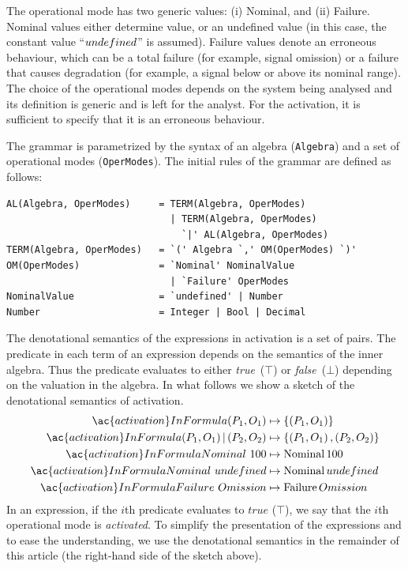 \documentclass[12pt,openright,twoside,a4paper,oldfontcommands,english,brazil,final]{abntex2}
\theoremstyle{theo}
\def\undefinednominal{\ensuremath undefined}
\newcommand{\Nominal}[1]{\ensuremath\mathop{\mathrm{Nominal}} #1}
\newcommand{\Failure}[1]{\ensuremath\mathop{\mathrm{Failure}} #1}
\begin{document}
The operational mode has two generic values: (i) Nominal, and (ii) Failure.
Nominal values either determine value, or an undefined value (in this case, the constant value ``$\undefinednominal$'' is assumed).
Failure values denote an erroneous behaviour, which can be a total failure (for example, signal omission) or a failure that causes degradation (for example, a signal below or above its nominal range).
The choice of the operational modes depends on the system being analysed and its definition is generic and is left for the analyst.
For the \ac{activation}, it is sufficient to specify that it is an erroneous behaviour.

The grammar is parametrized by the syntax of an algebra (\verb|Algebra|) and a set of operational modes (\verb|OperModes|).
The initial rules of the grammar are defined as follows:
\begin{verbatim}
AL(Algebra, OperModes)     = TERM(Algebra, OperModes) 
                             | TERM(Algebra, OperModes) 
                               `|' AL(Algebra, OperModes)
TERM(Algebra, OperModes)   = `(' Algebra `,' OM(OperModes) `)'
OM(OperModes)              = `Nominal' NominalValue 
                             | `Failure' OperModes
NominalValue               = `undefined' | Number
Number                     = Integer | Bool | Decimal
\end{verbatim}
%
The denotational semantics of the expressions in \ac{activation} is a set of pairs.
The predicate in each term of an expression depends on the semantics of the inner algebra.
Thus the predicate evaluates to either \emph{true}~($\top$) or \emph{false}~($\bot$) depending on the valuation in the algebra.
In what follows we show a sketch of the denotational semantics of \ac{activation}.
%
\begin{align*}
  \ac{activation}InFormula{\left(P_1, O_1\right)} &\mapsto \{\left(P_1, O_1\right)\}\\
  \ac{activation}InFormula{\left(P_1, O_1\right) | \left(P_2, O_2\right)} &\mapsto
    \{\left(P_1, O_1\right), \left(P_2, O_2\right)\}\\
  \ac{activation}InFormula{Nominal~100} &\mapsto \Nominal{100}\\
  \ac{activation}InFormula{Nominal~undefined} &\mapsto \Nominal{\undefinednominal}\\
  \ac{activation}InFormula{Failure~Omission} &\mapsto \Failure{Omission}
\end{align*}
%
In an expression, if the $i$th predicate evaluates to $true$ ($\top$), we say that the $i$th operational mode is \emph{activated}.
To simplify the presentation of the expressions and to ease the understanding, we use the denotational semantics in the remainder of this article (the right-hand side of the sketch above).
\end{document}
